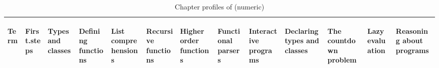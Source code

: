 \begin{table*}[h!]
\begin{minipage}[b]{0.5\linewidth}
{\begin{tabular}{lllllllllllll}
\begin{sideways} Term \end{sideways} & \begin{sideways} First.steps \end{sideways} & \begin{sideways} Types and classes \end{sideways} & \begin{sideways} Defining functions \end{sideways} & \begin{sideways} List comprehensions \end{sideways} & \begin{sideways} Recursive functions \end{sideways} & \begin{sideways} Higher order functions \end{sideways} & \begin{sideways} Functional parsers \end{sideways} & \begin{sideways} Interactive programs \end{sideways} & \begin{sideways} Declaring types and classes \end{sideways} & \begin{sideways} The countdown problem \end{sideways} & \begin{sideways} Lazy evaluation \end{sideways} & \begin{sideways} Reasoning about programs \end{sideways} \\ 
  \hline
    
  \hline
\end{tabular}}
\caption{Chapter profiles of \pihTag{} (numeric)}
\label{T:chapterProfilesPIHNumeric}
\end{minipage}
\end{table*}




